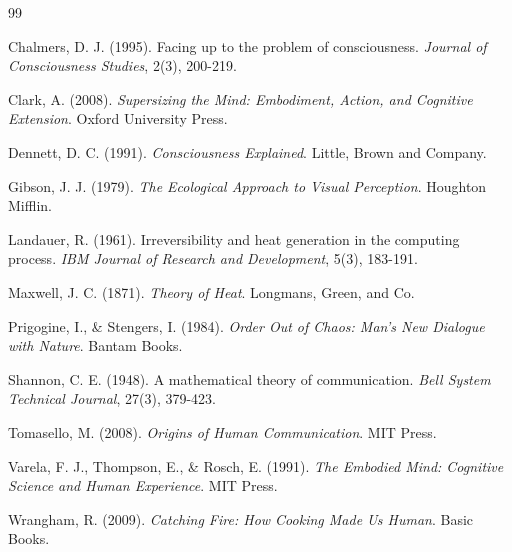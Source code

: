\documentclass[12pt]{article}
\theoremstyle{definition}
\theoremstyle{remark}
\begin{document}

\begin{thebibliography}{99}

 Chalmers, D. J. (1995). Facing up to the problem of consciousness. \textit{Journal of Consciousness Studies}, 2(3), 200-219.

 Clark, A. (2008). \textit{Supersizing the Mind: Embodiment, Action, and Cognitive Extension}. Oxford University Press.

 Dennett, D. C. (1991). \textit{Consciousness Explained}. Little, Brown and Company.

 Gibson, J. J. (1979). \textit{The Ecological Approach to Visual Perception}. Houghton Mifflin.

 Landauer, R. (1961). Irreversibility and heat generation in the computing process. \textit{IBM Journal of Research and Development}, 5(3), 183-191.

 Maxwell, J. C. (1871). \textit{Theory of Heat}. Longmans, Green, and Co.

 Prigogine, I., \& Stengers, I. (1984). \textit{Order Out of Chaos: Man's New Dialogue with Nature}. Bantam Books.

 Shannon, C. E. (1948). A mathematical theory of communication. \textit{Bell System Technical Journal}, 27(3), 379-423.

 Tomasello, M. (2008). \textit{Origins of Human Communication}. MIT Press.

 Varela, F. J., Thompson, E., \& Rosch, E. (1991). \textit{The Embodied Mind: Cognitive Science and Human Experience}. MIT Press.

 Wrangham, R. (2009). \textit{Catching Fire: How Cooking Made Us Human}. Basic Books.

\end{thebibliography}
\end{document}
